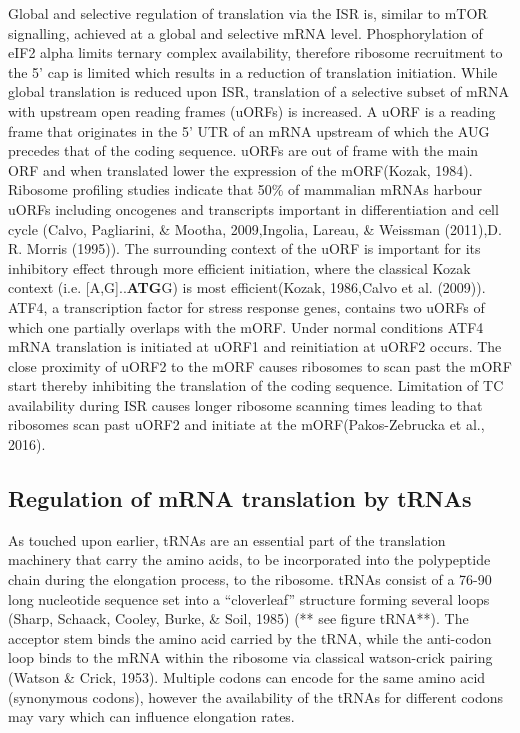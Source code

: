 \documentclass[12pt,openany]{book}
\begin{document}
Global and selective regulation of translation via the ISR is, similar
to mTOR signalling, achieved at a global and selective mRNA level.
Phosphorylation of eIF2 alpha limits ternary complex availability,
therefore ribosome recruitment to the 5' cap is limited which results in
a reduction of translation initiation. While global translation is
reduced upon ISR, translation of a selective subset of mRNA with
upstream open reading frames (uORFs) is increased. A uORF is a reading
frame that originates in the 5' UTR of an mRNA upstream of which the AUG
precedes that of the coding sequence. uORFs are out of frame with the
main ORF and when translated lower the expression of the mORF(Kozak,
1984). Ribosome profiling studies indicate that 50\% of mammalian mRNAs
harbour uORFs including oncogenes and transcripts important in
differentiation and cell cycle (Calvo, Pagliarini, \& Mootha,
2009,Ingolia, Lareau, \& Weissman (2011),D. R. Morris (1995)). The
surrounding context of the uORF is important for its inhibitory effect
through more efficient initiation, where the classical Kozak context
(i.e. {[}A,G{]}..\textbf{ATG}G) is most efficient(Kozak, 1986,Calvo et
al. (2009)). ATF4, a transcription factor for stress response genes,
contains two uORFs of which one partially overlaps with the mORF. Under
normal conditions ATF4 mRNA translation is initiated at uORF1 and
reinitiation at uORF2 occurs. The close proximity of uORF2 to the mORF
causes ribosomes to scan past the mORF start thereby inhibiting the
translation of the coding sequence. Limitation of TC availability during
ISR causes longer ribosome scanning times leading to that ribosomes scan
past uORF2 and initiate at the mORF(Pakos-Zebrucka et al., 2016).

\subsection{Regulation of mRNA translation by tRNAs} \label{tRNA}

As touched upon earlier, tRNAs are an essential part of the translation
machinery that carry the amino acids, to be incorporated into the
polypeptide chain during the elongation process, to the ribosome. tRNAs
consist of a 76-90 long nucleotide sequence set into a ``cloverleaf''
structure forming several loops (Sharp, Schaack, Cooley, Burke, \& Soil,
1985) (** see figure tRNA**). The acceptor stem binds the amino acid
carried by the tRNA, while the anti-codon loop binds to the mRNA within
the ribosome via classical watson-crick pairing (Watson \& Crick, 1953).
Multiple codons can encode for the same amino acid (synonymous codons),
however the availability of the tRNAs for different codons may vary
which can influence elongation rates.
\end{document}
